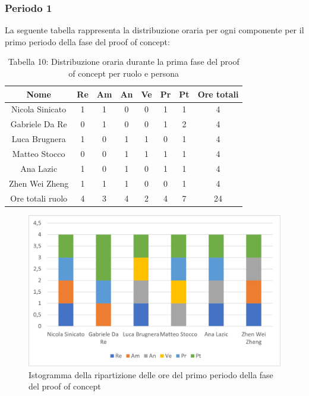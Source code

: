 \subsubsection{Periodo 1}
%
La seguente tabella rappresenta la distribuzione oraria per ogni componente per il primo periodo della fase del proof of concept:
\begin{table}[h]
	\setlength\extrarowheight{5pt}
	\centering
	\begin{tabularx}{\textwidth}{|ccccccc|c|}
		\hline
		\rowcolor{white}
		\textbf{Nome} & \textbf{Re} & \textbf{Am} & \textbf{An} & \textbf{Ve} & \textbf{Pr}& \textbf{Pt} & \textbf{Ore totali} \\
		\hline
		Nicola Sinicato &1&1&0&0&1&1&4 \\
		Gabriele Da Re &0&1&0&0&1&2&4 \\
		Luca Brugnera &1&0&1&1&0&1&4 \\
		Matteo Stocco &0&0&1&1&1&1&4 \\
		Ana Lazic &1&0&1&0&1&1&4 \\
		Zhen Wei Zheng &1&1&1&0&0&1&4 \\
		\hline
		Ore totali ruolo &4&3&4&2&4&7&24 \\
		\hline
	\end{tabularx}
	\vspace{10pt}
	\caption{Tabella 10: Distribuzione oraria durante la prima fase del proof of concept per ruolo e persona}
\end{table}
\begin{figure}[H]
    \centering
    \includegraphics[scale=0.6]{img/grafi preventivo/istogrammi/proof/periodo1.png}
    \caption{Istogramma della ripartizione delle ore del primo periodo della fase del proof of concept}
\end{figure}

